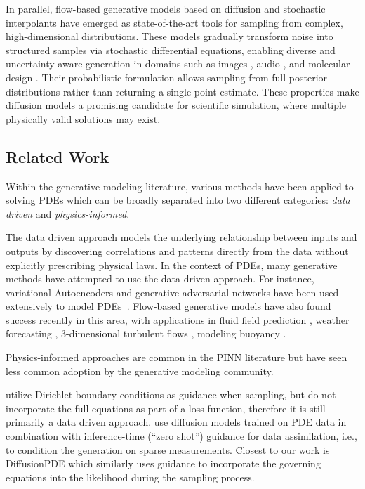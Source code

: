 In parallel, flow-based generative models based on diffusion \citep{song2021scorebasedgenerativemodelingstochastic} and stochastic interpolants \cite{JMLR:v26:23-1605} have emerged as state-of-the-art tools for sampling from complex, high-dimensional distributions. These models gradually transform noise into structured samples via stochastic differential equations, enabling diverse and uncertainty-aware generation in domains such as images \citep{rombach2022high, dhariwal2021diffusion}, audio \citep{kong2020diffwave, huang2023make, liu2023audioldm}, and molecular design \citep{guo2024diffusion, yim2024diffusion}. Their probabilistic formulation allows sampling from full posterior distributions rather than returning a single point estimate. These properties make diffusion models a promising candidate for scientific simulation, where multiple physically valid solutions may exist.

\subsection{Related Work}
Within the generative modeling literature, various methods have been applied to solving PDEs which can be broadly separated into two different categories: \emph{data driven} and \emph{physics-informed}. 

The data driven approach models the underlying relationship between inputs and outputs by discovering correlations and patterns directly from the data without explicitly prescribing physical laws. In the context of PDEs, many generative methods have attempted to use the data driven approach. For instance, variational Autoencoders and generative adversarial networks have been used extensively to model PDEs~\citep{gonzalez2018deep, creswell2018generative, farimani1709deep, mirza2014conditional}. Flow-based generative models have also found success recently in this area, with applications in fluid field prediction \citep{yang2023denoising, kohl2023benchmarking, Qiang2024-DDPM-Airfoil}, weather forecasting \citep{Price2025-GenCast},
3-dimensional turbulent flows \citep{molinaro2024generative}, modeling buoyancy \citep{li2025generative}.

Physics-informed approaches are common in the PINN literature \citep{cai2021physics, cai2021physicsheat, raissi2019physics} but have seen less common adoption by the generative modeling community.

\citet{lienen2306zero} utilize Dirichlet boundary conditions as guidance when sampling, but do not incorporate the full equations as part of a loss function, therefore it is still primarily a data driven approach. \citet{shysheya2024on,rozet2023score} use diffusion models trained on PDE data in combination with inference-time (``zero shot'') guidance for data assimilation, i.e., to condition the generation on sparse measurements. Closest to our work is
DiffusionPDE \citep{huang2024diffusionpdegenerativepdesolvingpartial} which similarly uses guidance to incorporate the governing equations into the likelihood during the sampling process.
%

